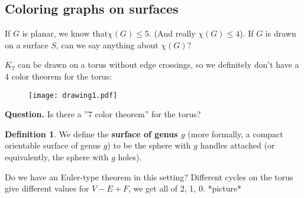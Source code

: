 \documentclass{article}
\theoremstyle{definition}
\newtheorem{defn}{Definition}[section]
\begin{document}
\subsection{Coloring graphs on surfaces}


If $G$ is planar, we know that$\chi(G) \le 5$. (And really $\chi(G)\le 4$). If $G$ is drawn on a surface $S$, can we say anything about $\chi(G)$?
\vspace{1mm}

$K_7$ can be drawn on a torus without edge crossings, so we definitely don't have a 4 color theorem for the torus:

\begin{figure}[H]
    \centering
    \texttt{[image: drawing1.pdf]}
\end{figure}

\textbf{Question.} Is there a ''7 color theorem'' for the torus?

\begin{defn}
    We define the \textbf{surface of genus $g$} (more formally, a compact orientable surface of genus $g$) to be the sphere with $g$ handles attached (or equivalently, the sphere with $g$ holes).
\end{defn}

Do we have an Euler-type theorem in this setting? Different cycles on the torus give different values for $V-E+F$, we get all of 2, 1, 0. *picture*
\end{document}

